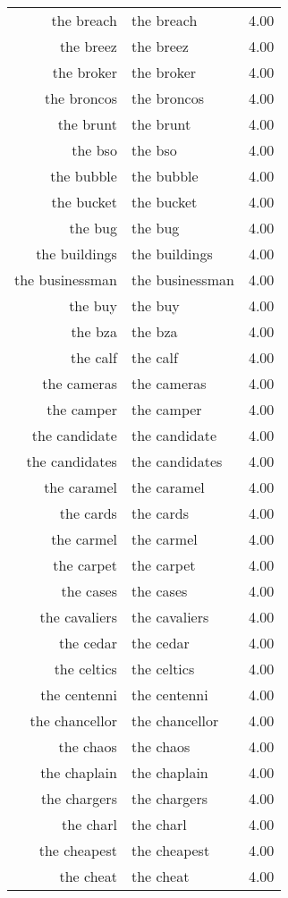 \begin{table}[ht]
\begin{tabular}{rlr}
  the breach & the breach & 4.00 \\ 
  the breez & the breez & 4.00 \\ 
  the broker & the broker & 4.00 \\ 
  the broncos & the broncos & 4.00 \\ 
  the brunt & the brunt & 4.00 \\ 
  the bso & the bso & 4.00 \\ 
  the bubble & the bubble & 4.00 \\ 
  the bucket & the bucket & 4.00 \\ 
  the bug & the bug & 4.00 \\ 
  the buildings & the buildings & 4.00 \\ 
  the businessman & the businessman & 4.00 \\ 
  the buy & the buy & 4.00 \\ 
  the bza & the bza & 4.00 \\ 
  the calf & the calf & 4.00 \\ 
  the cameras & the cameras & 4.00 \\ 
  the camper & the camper & 4.00 \\ 
  the candidate & the candidate & 4.00 \\ 
  the candidates & the candidates & 4.00 \\ 
  the caramel & the caramel & 4.00 \\ 
  the cards & the cards & 4.00 \\ 
  the carmel & the carmel & 4.00 \\ 
  the carpet & the carpet & 4.00 \\ 
  the cases & the cases & 4.00 \\ 
  the cavaliers & the cavaliers & 4.00 \\ 
  the cedar & the cedar & 4.00 \\ 
  the celtics & the celtics & 4.00 \\ 
  the centenni & the centenni & 4.00 \\ 
  the chancellor & the chancellor & 4.00 \\ 
  the chaos & the chaos & 4.00 \\ 
  the chaplain & the chaplain & 4.00 \\ 
  the chargers & the chargers & 4.00 \\ 
  the charl & the charl & 4.00 \\ 
  the cheapest & the cheapest & 4.00 \\ 
  the cheat & the cheat & 4.00 \\ 

\end{tabular}
\end{table}
